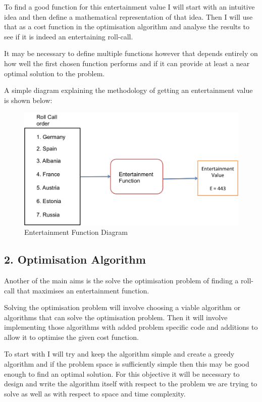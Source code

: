 \documentclass[12pt]{report}
\begin{document}
To find a good function for this entertainment value I will start with an intuitive idea and then define a mathematical representation of that idea. Then I will use that as a cost function in the optimisation algorithm and analyse the results to see if it is indeed an entertaining roll-call.

It may be necessary to define multiple functions however that depends entirely on how well the first chosen function performs and if it can provide at least a near optimal solution to the problem.

A simple diagram explaining the methodology of getting an entertainment value is shown below:

\begin{figure}[h]
\label{entertainmentFunctionDiagram}
\caption{Entertainment Function Diagram}
\includegraphics[scale=0.75]{EntertainmentFunctionDiagram.png}
\end{figure}

\subsection*{2. Optimisation Algorithm}
Another of the main aims is the solve the optimisation problem of finding a roll-call that maximises an entertainment function.

Solving the optimisation problem will involve choosing a viable algorithm or algorithms that can solve the optimisation problem. Then it will involve implementing those algorithms with added problem specific code and additions to allow it to optimise the given cost function.

To start with I will try and keep the algorithm simple and create a greedy algorithm\cite{ref:GreedyAlgorithms1}\cite{ref:GreedyAlgorithms2} and if the problem space is sufficiently simple then this may be good enough to find an optimal solution. For this objective it will be necessary to design and write the algorithm itself with respect to the problem we are trying to solve as well as with respect to space and time complexity.
\end{document}
